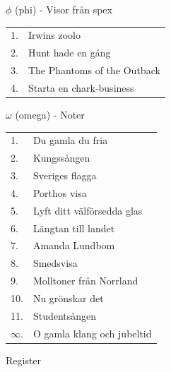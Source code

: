 \documentclass[a6paper,10pt]{article}
\begin{document}
\newpage

\noindent \Large $\phi$ (phi) - Visor från spex

\noindent
\normalsize
\begin{tabularx}{1\textwidth}{l X}
1.&Irwins zoolo\\
2.&Hunt hade en gång\\
3.&The Phantoms of the Outback\\
4.&Starta en chark-business
\end{tabularx}

\vspace{5pt}

\noindent \Large $\omega$ (omega) - Noter

\noindent
\normalsize
\begin{tabularx}{1\textwidth}{l X}
1.&Du gamla du fria\\
2.&Kungssången\\
3.&Sveriges flagga\\
4.&Porthos visa\\
5.&Lyft ditt välförsedda glas\\
6.&Längtan till landet\\
7.&Amanda Lundbom\\
8.&Smedsvisa\\
9.&Molltoner från Norrland\\
10.&Nu grönskar det\\
11.&Studentsången\\
$\infty$.&O gamla klang och jubeltid
\end{tabularx}

\vspace{5pt}

\noindent
\Large Register
\end{document}
